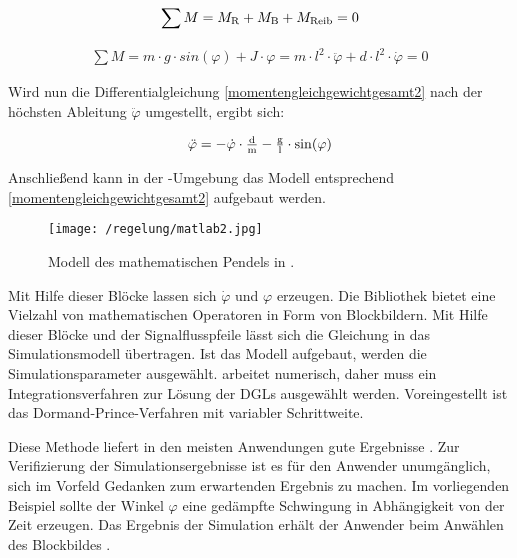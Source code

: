 \begin{align}
	\sum M = M_\i{R} + M_\i{B} + M_\i{Reib} = 0
	\label{momentengleichgewichtgesamt} 
\end{align}

\begin{align}
	\sum M = m \cdot g \cdot \si{sin}(\varphi) + J \cdot \varphi = m \cdot l^{2} \cdot \ddot\varphi + d \cdot l^{2} \cdot \dot\varphi = 0
	\label{momentengleichgewichtgesamt2} 
\end{align}

Wird nun die Differentialgleichung \ref{momentengleichgewichtgesamt2} nach der höchsten Ableitung $\ddot\varphi$ umgestellt, ergibt sich:

\begin{align}
	\ddot\varphi = -\dot\varphi \cdot \tfrac{\i{d}}{\i{m}} - \tfrac{\i{g}}{\i{l}} \cdot \si{sin}(\varphi)
	\label{diffgleichung} 
\end{align}


Anschließend kann in der -Umgebung das Modell entsprechend \ref{momentengleichgewichtgesamt2} aufgebaut werden.

\begin{figure}[h]
	\centering
	\texttt{[image: /regelung/matlab2.jpg]}
	\label{fig:matlab2}
	\caption{Modell des mathematischen Pendels in  .}
\end{figure}
\pagebreak
Mit Hilfe dieser Blöcke lassen sich  $\dot{\varphi}$ und $\varphi$ erzeugen.
Die  Bibliothek bietet eine Vielzahl von mathematischen Operatoren in Form von Blockbildern.
Mit Hilfe dieser Blöcke und der Signalflusspfeile lässt sich die Gleichung in das Simulationsmodell übertragen.
Ist das Modell aufgebaut, werden die Simulationsparameter ausgewählt. 
 arbeitet numerisch, daher muss ein Integrationsverfahren zur Lösung der DGLs ausgewählt werden. Voreingestellt ist das Dormand-Prince-Verfahren mit variabler Schrittweite.

Diese Methode liefert in den meisten Anwendungen gute Ergebnisse \autocite{scherf2010}.
Zur Verifizierung der Simulationsergebnisse ist es für den Anwender unumgänglich, sich im Vorfeld Gedanken zum erwartenden Ergebnis zu machen.
Im vorliegenden Beispiel sollte der Winkel $\varphi$ eine gedämpfte Schwingung in Abhängigkeit von der Zeit erzeugen.
Das Ergebnis der Simulation erhält der Anwender beim Anwählen des Blockbildes \grqq.

